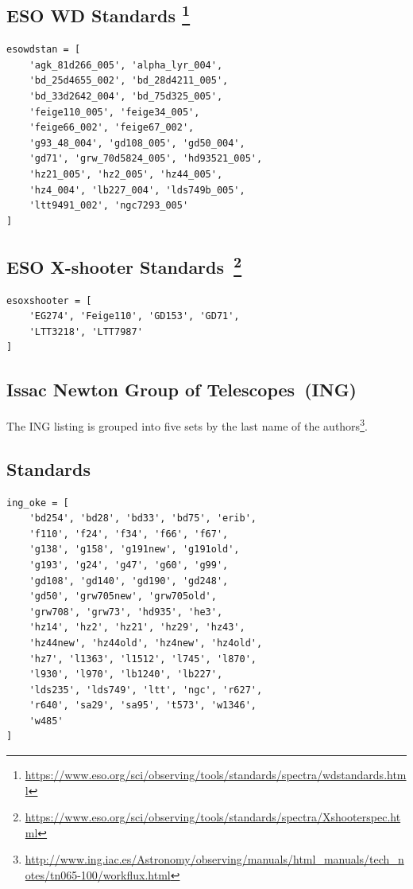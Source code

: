 \documentclass[fleqn,usenatbib]{mnras}
\begin{document}
\subsection*{ESO \citet{1995AJ....110.1316B} WD Standards \footnote{\url{https://www.eso.org/sci/observing/tools/standards/spectra/wdstandards.html}}}
\begin{verbatim}
esowdstan = [
    'agk_81d266_005', 'alpha_lyr_004',
    'bd_25d4655_002', 'bd_28d4211_005',
    'bd_33d2642_004', 'bd_75d325_005',
    'feige110_005', 'feige34_005',
    'feige66_002', 'feige67_002',
    'g93_48_004', 'gd108_005', 'gd50_004',
    'gd71', 'grw_70d5824_005', 'hd93521_005',
    'hz21_005', 'hz2_005', 'hz44_005',
    'hz4_004', 'lb227_004', 'lds749b_005',
    'ltt9491_002', 'ngc7293_005'
]
\end{verbatim}

\subsection*{ESO X-shooter Standards~\citep{2014Msngr.158...16M, 2014A&A...568A...9M}\footnote{\url{https://www.eso.org/sci/observing/tools/standards/spectra/Xshooterspec.html}}}
\begin{verbatim}
esoxshooter = [
    'EG274', 'Feige110', 'GD153', 'GD71',
    'LTT3218', 'LTT7987'
]
\end{verbatim}

\subsection{Issac Newton Group of Telescopes~(ING)}

The ING listing is grouped into five sets by the last name of the authors\footnote{\url{http://www.ing.iac.es/Astronomy/observing/manuals/html_manuals/tech_notes/tn065-100/workflux.html}}.
\subsection*{\citet{1990AJ.....99.1621O} Standards}
\begin{verbatim}
ing_oke = [
    'bd254', 'bd28', 'bd33', 'bd75', 'erib',
    'f110', 'f24', 'f34', 'f66', 'f67',
    'g138', 'g158', 'g191new', 'g191old',
    'g193', 'g24', 'g47', 'g60', 'g99',
    'gd108', 'gd140', 'gd190', 'gd248',
    'gd50', 'grw705new', 'grw705old',
    'grw708', 'grw73', 'hd935', 'he3',
    'hz14', 'hz2', 'hz21', 'hz29', 'hz43',
    'hz44new', 'hz44old', 'hz4new', 'hz4old',
    'hz7', 'l1363', 'l1512', 'l745', 'l870',
    'l930', 'l970', 'lb1240', 'lb227',
    'lds235', 'lds749', 'ltt', 'ngc', 'r627',
    'r640', 'sa29', 'sa95', 't573', 'w1346',
    'w485'
]
\end{verbatim}
\end{document}
